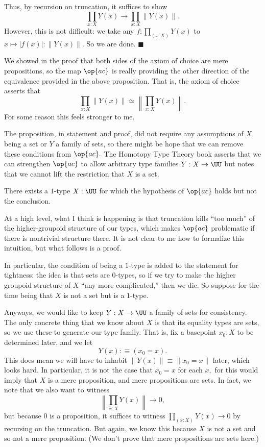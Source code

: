 Thus, by recursion on truncation, it suffices to show
\[\prod_{x:X}Y(x)\to\prod_{x:X}\lVert Y(x)\rVert.\]
However, this is not difficult: we take any $f:\prod_{(x:X)}Y(x)$ to $x\mapsto|f(x)|:\lVert Y(x)\rVert.$ So we are done. $\blacksquare$

We showed in the proof that both sides of the axiom of choice are mere propositions, so the map $\op{ac}$ is really providing the other direction of the equivalence provided in the above proposition. That is, the axiom of choice asserts that
\[\prod_{x:X}\lVert Y(x)\rVert\simeq\left\lVert\prod_{x:X}Y(x)\right\rVert.\]
For some reason this feels stronger to me.

The proposition, in statement and proof, did not require any assumptions of $X$ being a set or $Y$ a family of sets, so there might be hope that we can remove these conditions from $\op{ac}.$ The Homotopy Type Theory book asserts that we can strengthen $\op{ac}$ to allow arbitrary type families $Y:X\to\UU$ but notes that we cannot lift the restriction that $X$ is a set.

\begin{proposition}
    There exists a $1$-type $X:\UU$ for which the hypothesis of $\op{ac}$ holds but not the conclusion.
\end{proposition}
At a high level, what I think is happening is that truncation kills ``too much'' of the higher-groupoid structure of our types, which makes $\op{ac}$ problematic if there is nontrivial structure there. It is not clear to me how to formalize this intuition, but what follows is a proof.

In particular, the condition of being a $1$-type is added to the statement for tightness: the idea is that sets are $0$-types, so if we try to make the higher groupoid structure of $X$ ``any more complicated,'' then we die. So suppose for the time being that $X$ is not a set but is a $1$-type.

Anyways, we would like to keep $Y:X\to\UU$ a family of sets for consistency. The only concrete thing that we know about $X$ is that its equality types are sets, so we use these to generate our type family. That is, fix a basepoint $x_0:X$ to be determined later, and we let
\[Y(x):\equiv(x_0=x).\]
This does mean we will have to inhabit $\lVert Y(x)\rVert\equiv\lVert x_0=x\rVert$ later, which looks hard. In particular, it is not the case that $x_0=x$ for each $x,$ for this would imply that $X$ is a mere proposition, and mere propositions are sets. In fact, we note that we also want to witness
\[\left\lVert\prod_{x:X}Y(x)\right\rVert\to0,\]
but because $0$ is a proposition, it suffices to witness $\prod_{(x:X)}Y(x)\to0$ by recursing on the truncation. But again, we know this because $X$ is not a set and so not a mere proposition. (We don't prove that mere propositions are sets here.)

